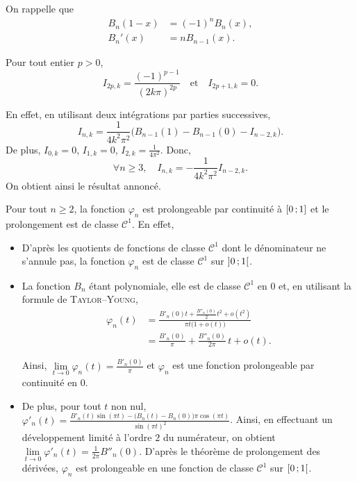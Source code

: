 On rappelle que 
\begin{align*}
B_n(1 - x) &= (-1)^n B_n(x),\\
B_n'(x) &= n B_{n-1}(x).
\end{align*}

\begin{elemsolution}
\begin{reponses}
\item Pour tout entier $p > 0$,
\[
I_{2p, k} = \frac{(-1)^{p-1}}{(2 k \pi)^{2p}} \quad \text{et} \quad I_{2p+1,k} = 0.
\]

En effet, en utilisant deux intégrations par parties successives,
\[
I_{n,k} = \frac{1}{4k^2 \pi^2} \big(B_{n-1}(1) - B_{n-1}(0) - I_{n-2, k} \big).
\]
De plus, $I_{0,k} = 0$, $I_{1,k} = 0$, $I_{2,k} = \frac{1}{4 \pi^2}$. Donc,
\[
\forall n \geqslant 3,\quad I_{n,k} = - \frac{1}{4 k^2 \pi^2}I_{n-2, k}.
\]
On obtient ainsi le résultat annoncé.
\item Pour tout $n \geqslant 2$, la fonction $\varphi_n$ est prolongeable par continuité à $\left[0\,;1\right]$ et le prolongement est de classe $\mathscr{C}^1$. En effet,

\begin{itemize}
\item D'après les quotients de fonctions de classe $\mathscr{C}^1$ dont le dénominateur ne s'annule pas, la fonction $\varphi_n$ est de classe $\mathscr{C}^1$ sur $\left]0\,;1\right[$.

\item La fonction $B_n$ étant polynomiale, elle est de classe $\mathscr{C}^1$ en $0$ et, en utilisant la formule de \textsc{Taylor}--\textsc{Young},
\begin{align*}
\varphi_n(t) &= \frac{B'_n(0)t + \frac{B''_n(0)}{2}t^2 + o(t^2)}{\pi t \big(1 + o(t) \big)} \\
&= \frac{B'_n(0)}{\pi} + \frac{B''_n(0)}{2 \pi} \, t + o(t).
\end{align*}

Ainsi, $\lim\limits_{t \to 0} \varphi_n(t) = \frac{B'_n(0)}{\pi}$ et $\varphi_n$ est une fonction prolongeable par continuité en $0$.

\item
%
De plus, pour tout $t$ non nul, $\displaystyle \varphi'_n(t) = \frac{B'_n(t) \sin(\pi t) - \big(B_n(t) - B_n(0) \big) \pi \cos(\pi t)}{\sin(\pi t)^2}$. Ainsi, en effectuant un développement limité à l'ordre $2$ du numérateur, on obtient $\lim\limits_{t \to 0} \varphi'_n(t) = \frac{1}{2 \pi} B''_n(0)$.
D'après le théorème de prolongement des dérivées, $\varphi_n$ est prolongeable en une fonction de classe $\mathscr{C}^1$ sur $\left[0\,;1\right[$.


\end{itemize}
\end{reponses}
\end{elemsolution}
